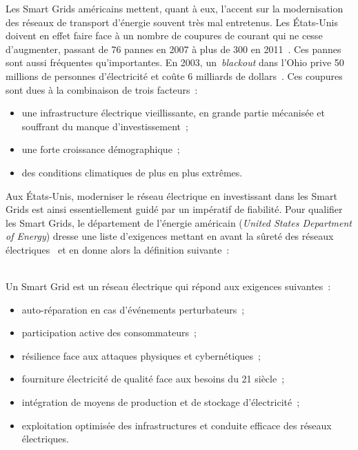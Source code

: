 Les Smart Grids américains mettent, quant à eux, l'accent sur la modernisation 
des réseaux de transport d'énergie souvent très mal entretenus. Les États-Unis 
doivent en effet faire face à un nombre de coupures de courant qui ne cesse 
d'augmenter, passant de 76 pannes en 2007 à plus de 300 en 2011~\cite{detroit}. 
Ces pannes sont aussi fréquentes qu'importantes. En 2003, un~\textit{blackout} 
dans l'Ohio prive 50 millions de personnes d'électricité et coûte 6 milliards 
de dollars~\cite{andersson2005causes}. Ces coupures sont dues à la combinaison 
de trois facteurs~\cite{outages}:

\begin{itemize}
    \item une infrastructure électrique vieillissante, en grande partie
    mécanisée et souffrant du manque d'investissement~;
    \item une forte croissance démographique~;
    \item des conditions climatiques de plus en plus extrêmes.
\end{itemize}

Aux États-Unis, moderniser le réseau électrique en investissant dans les Smart 
Grids est ainsi essentiellement guidé par un impératif de fiabilité. Pour 
qualifier les Smart Grids, le département de l'énergie américain (\textit{United 
States Department of Energy}) dresse une liste d'exigences mettant en avant la 
sûreté des réseaux électriques~\cite{USDE} et en donne alors la définition suivante~:
\\\
\begin{definition}
Un Smart Grid est un réseau électrique qui répond aux exigences suivantes~:
    \begin{itemize}
        \item auto-réparation en cas d'événements perturbateurs~;
        \item participation active des consommateurs~; 
        \item résilience face aux attaques physiques et cybernétiques~;
        \item fourniture électricité de qualité face aux besoins du 21
              siècle~;
        \item intégration de moyens de production et de stockage d'électricité~;
        \item exploitation optimisée des infrastructures et conduite efficace des 
    réseaux électriques.
    \end{itemize}
\end{definition}

